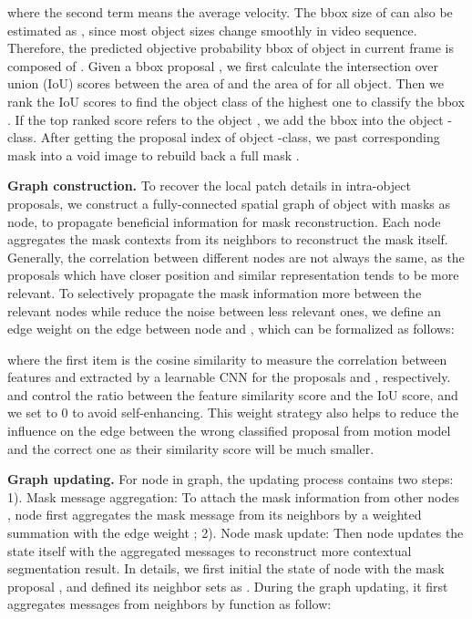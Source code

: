 \documentclass[letterpaper]{article} \usepackage{aaai21}  \usepackage{times}  \usepackage{helvet} \usepackage{courier}  \usepackage[hyphens]{url}  \usepackage{graphicx} \urlstyle{rm} \def\UrlFont{\rm}  \usepackage{graphicx}  \usepackage{natbib}  \usepackage{caption} \frenchspacing  \setlength{\pdfpagewidth}{8.5in}  \setlength{\pdfpageheight}{11in}  \usepackage{amsmath}
\begin{document}
where the second term means the average velocity. The bbox size  of  can also be estimated as , since most object sizes change smoothly in video sequence. Therefore, the predicted objective probability bbox  of object  in current frame  is composed of .
Given a bbox proposal , we first calculate the intersection over union (IoU) scores between the area of  and the area of  for all object. Then we rank the IoU scores to find the object class of the highest one to classify the bbox .
If the top ranked score refers to the object , we add the bbox  into the object -class.
After getting the proposal index  of object -class, we past corresponding mask into a void image to rebuild back a full mask . 

\noindent \textbf{Graph construction.}
To recover the local patch details in intra-object proposals, we construct a fully-connected spatial graph of object  with masks  as node, to propagate beneficial information for mask reconstruction. Each node aggregates the mask contexts from its neighbors to reconstruct the mask itself. Generally, the correlation between different nodes are not always the same, as the proposals which have closer position and similar representation tends to be more relevant. 
To selectively propagate the mask information more between the relevant nodes while reduce the noise between less relevant ones, we define an edge weight  on the edge between node  and , which can be formalized as follows:

where the first item is the cosine similarity to measure the correlation between features  and  extracted by a learnable CNN for the proposals  and , respectively.  and  control the ratio between the feature similarity score and the IoU score, and we set  to 0 to avoid self-enhancing. This weight strategy also helps to reduce the influence on the edge between the wrong classified proposal from motion model and the correct one as their similarity score will be much smaller.

\noindent \textbf{Graph updating.}
For node  in graph, the updating process contains two steps: 1). Mask message aggregation: To attach the mask information from other nodes , node  first aggregates the mask message  from its neighbors by a weighted summation with the edge weight ; 2). Node mask update: Then node  updates the state  itself with the aggregated messages  to reconstruct more contextual segmentation result.
In details, we first initial the state  of node  with the mask proposal , and defined its neighbor sets as . During the graph updating, it first aggregates messages  from neighbors  by function  as follow:
\end{document}
